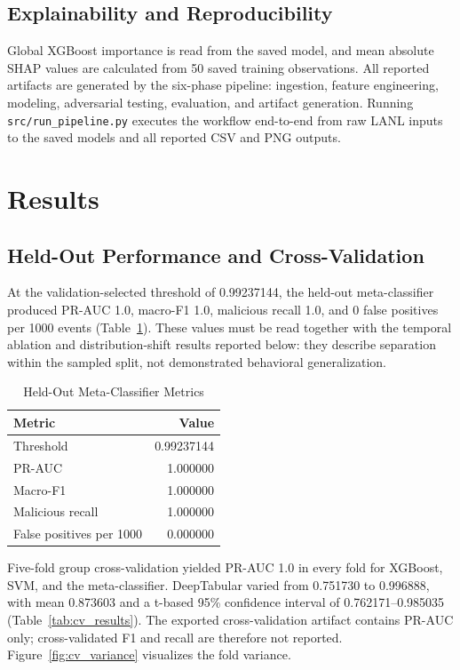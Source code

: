 \documentclass[journal]{IEEEtran}
\begin{document}
\subsection{Explainability and Reproducibility}
Global XGBoost importance is read from the saved model, and mean absolute SHAP values are calculated from 50 saved training observations. All reported artifacts are generated by the six-phase pipeline: ingestion, feature engineering, modeling, adversarial testing, evaluation, and artifact generation. Running \texttt{src/run\_pipeline.py} executes the workflow end-to-end from raw LANL inputs to the saved models and all reported CSV and PNG outputs.

\section{Results}
\subsection{Held-Out Performance and Cross-Validation}
At the validation-selected threshold of 0.99237144, the held-out meta-classifier produced PR-AUC 1.0, macro-F1 1.0, malicious recall 1.0, and 0 false positives per 1000 events (Table~\ref{tab:heldout_metrics}). These values must be read together with the temporal ablation and distribution-shift results reported below: they describe separation within the sampled split, not demonstrated behavioral generalization.

\begin{table}[!htbp]
\caption{Held-Out Meta-Classifier Metrics}
\label{tab:heldout_metrics}
\centering
\begin{tabular}{lr}
\toprule
Metric & Value \\
\midrule
Threshold & 0.99237144 \\
PR-AUC & 1.000000 \\
Macro-F1 & 1.000000 \\
Malicious recall & 1.000000 \\
False positives per 1000 & 0.000000 \\
\bottomrule
\end{tabular}
\end{table}

Five-fold group cross-validation yielded PR-AUC 1.0 in every fold for XGBoost, SVM, and the meta-classifier. DeepTabular varied from 0.751730 to 0.996888, with mean 0.873603 and a t-based 95\% confidence interval of 0.762171--0.985035 (Table~\ref{tab:cv_results}). The exported cross-validation artifact contains PR-AUC only; cross-validated F1 and recall are therefore not reported. Figure~\ref{fig:cv_variance} visualizes the fold variance.
\end{document}
